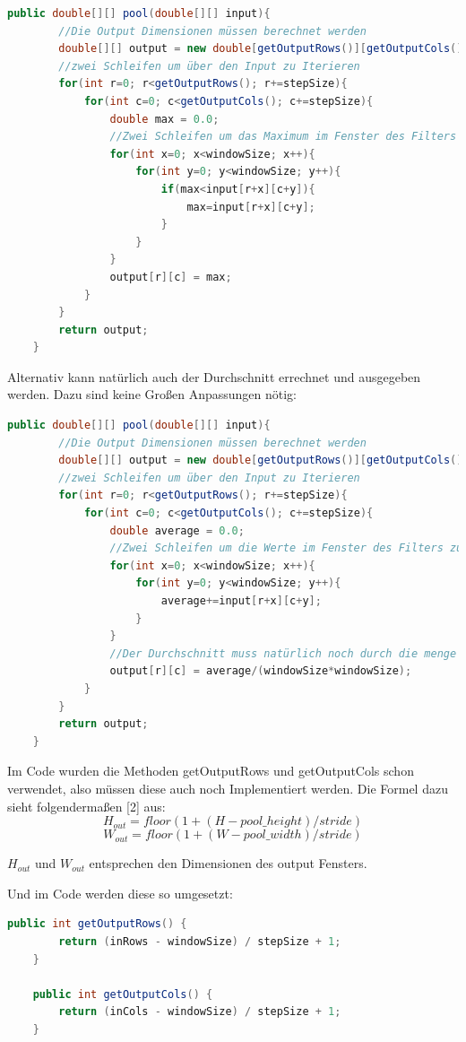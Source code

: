 \documentclass[12pt]{article}
\begin{document}
\begin{lstlisting}[language=Java]
 public double[][] pool(double[][] input){
 		//Die Output Dimensionen müssen berechnet werden
        double[][] output = new double[getOutputRows()][getOutputCols()];
        //zwei Schleifen um über den Input zu Iterieren
        for(int r=0; r<getOutputRows(); r+=stepSize){
            for(int c=0; c<getOutputCols(); c+=stepSize){
                double max = 0.0;
                //Zwei Schleifen um das Maximum im Fenster des Filters zu finden
                for(int x=0; x<windowSize; x++){
                    for(int y=0; y<windowSize; y++){
                        if(max<input[r+x][c+y]){
                            max=input[r+x][c+y];
                        }
                    }
                }
                output[r][c] = max;
            }
        }
        return output;
    }
\end{lstlisting}
Alternativ kann natürlich auch der Durchschnitt errechnet und ausgegeben werden. Dazu sind keine Großen Anpassungen nötig:
\begin{lstlisting}[language=Java]
 public double[][] pool(double[][] input){
 		//Die Output Dimensionen müssen berechnet werden
        double[][] output = new double[getOutputRows()][getOutputCols()];
        //zwei Schleifen um über den Input zu Iterieren
        for(int r=0; r<getOutputRows(); r+=stepSize){
            for(int c=0; c<getOutputCols(); c+=stepSize){
                double average = 0.0;
                //Zwei Schleifen um die Werte im Fenster des Filters zu addieren
                for(int x=0; x<windowSize; x++){
                    for(int y=0; y<windowSize; y++){
                    	average+=input[r+x][c+y];
                    }
                }
                //Der Durchschnitt muss natürlich noch durch die menge der im Filter Fenster enthaltenen Pixel geteilt werden
                output[r][c] = average/(windowSize*windowSize);
            }
        }
        return output;
    }
\end{lstlisting}
Im Code wurden die Methoden getOutputRows und getOutputCols schon verwendet, also müssen diese auch noch Implementiert werden. Die Formel dazu sieht folgendermaßen [2] aus:
$$H_{out} = floor(1 + (H - pool\_height)/stride)$$
$$W_{out} = floor(1 + (W - pool\_ width)/stride)$$

$H_{out}$ und $W_{out}$ entsprechen den Dimensionen des output Fensters. 

Und im Code werden diese so umgesetzt:

\begin{lstlisting}[language=Java]
    public int getOutputRows() {
        return (inRows - windowSize) / stepSize + 1;
    }

    public int getOutputCols() {
        return (inCols - windowSize) / stepSize + 1;
    }
\end{lstlisting}
\end{document}
